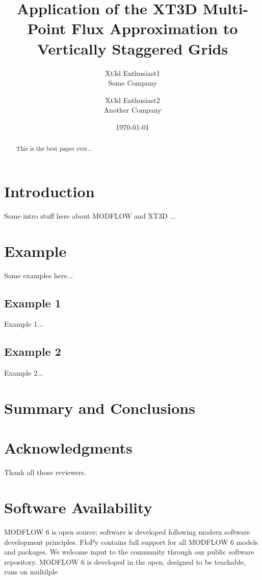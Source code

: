 \documentclass{article}
\title{Application of the XT3D Multi-Point Flux Approximation to Vertically Staggered Grids}
\author{Xt3d Enthusiast1  \\
	Some Company  \\
	\and 
	Xt3d Enthusiast2 \\
	Another Company \\
	}
\date{\today}
\begin{document}
\maketitle


\begin{abstract}
This is the best paper ever... 
\end{abstract}

\section{Introduction}

Some intro stuff here about MODFLOW \citep{modflow6framework, modflow6gwf, modflow6gwt} and XT3D \citep{modflow6xt3d}...


\section{Example}

Some examples here...  

\subsection{Example 1}

Example 1...

\subsection{Example 2}

Example 2...

\section{Summary and Conclusions}

\section{Acknowledgments}
Thank all those reviewers.

\section{Software Availability}
MODFLOW 6 is open source; software is developed following modern software development principles.  FloPy \citep{bakker2016scripting} contains full support for all MODFLOW 6 models and packages.  We welcome input to the community through our public software repository.  MODFLOW 6 is developed in the open, designed to be teachable, runs on multilple


\end{document}
